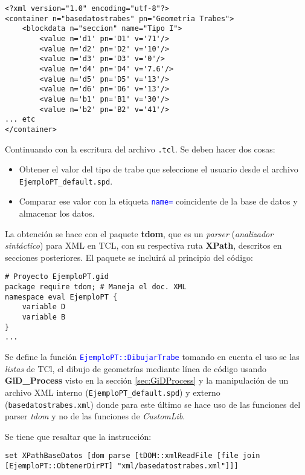 \documentclass[10pt, a4paper, twocolumn]{article} %
\begin{document}
\lstset{language=XML} 
\begin{lstlisting}[caption={Extracto de la base de datos de la geometría.}]
<?xml version="1.0" encoding="utf-8"?>
<container n="basedatostrabes" pn="Geometria Trabes">
	<blockdata n="seccion" name="Tipo I">
		<value n='d1' pn='D1' v='71'/>
		<value n='d2' pn='D2' v='10'/>
		<value n='d3' pn='D3' v='0'/>
		<value n='d4' pn='D4' v='7.6'/>
		<value n='d5' pn='D5' v='13'/>
		<value n='d6' pn='D6' v='13'/>
		<value n='b1' pn='B1' v='30'/>
		<value n='b2' pn='B2' v='41'/>
... etc
</container>
\end{lstlisting}

Continuando con la escritura del archivo \texttt{.tcl}. Se deben hacer dos cosas:

\begin{itemize}
	\item Obtener el valor del tipo de trabe que seleccione el usuario desde el archivo \texttt{EjemploPT\_default.spd}.
	\item Comparar ese valor con la etiqueta \textcolor{blue}{\texttt{name=}} coincidente de la base de datos y almacenar los datos.
\end{itemize}

La obtención se hace con el paquete \textbf{tdom}, que es un \textit{parser} (\textit{analizador sintáctico}) para XML en TCL, con su respectiva ruta \textbf{XPath}, descritos en secciones posteriores. El paquete se incluirá al principio del código:

\lstset{language=tcl} 
\begin{lstlisting}[caption={Código para inicializar el proyecto y crear el menú.}]
# Proyecto EjemploPT.gid
package require tdom; # Maneja el doc. XML
namespace eval EjemploPT {
	variable D
	variable B
}
...
\end{lstlisting}

Se define la función \textcolor{blue}{\texttt{EjemploPT::DibujarTrabe}} tomando en cuenta el uso se las \textit{listas} de TCl, el dibujo de geometrías mediante línea de código usando \textbf{GiD\_Process} visto en la sección \ref{sec:GiDProcess} y la manipulación de un archivo XML interno (\texttt{EjemploPT\_default.spd}) y externo (\texttt{basedatostrabes.xml}) donde para este último se hace uso de las funciones del parser \textit{tdom} y no de las funciones de \textit{CustomLib}.

Se tiene que resaltar que la instrucción:

\lstset{language=tcl} 
\begin{lstlisting}[caption={Obtener el nodo raíz del archivo \texttt{basedatostrabes.xml}.}]
	set XPathBaseDatos [dom parse [tDOM::xmlReadFile [file join [EjemploPT::ObtenerDirPT] "xml/basedatostrabes.xml"]]]
\end{lstlisting}
\end{document}
